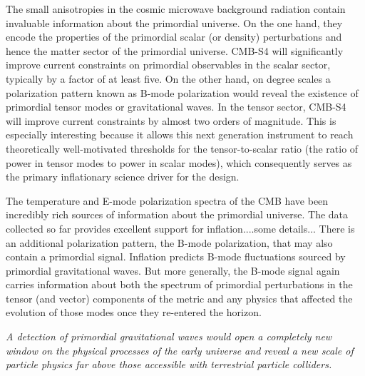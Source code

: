 The small anisotropies in the cosmic microwave background radiation contain invaluable information about the primordial universe. On the one hand, they encode the properties of the primordial scalar (or density) perturbations and hence the matter sector of the primordial universe. 
CMB-S4 will significantly improve current constraints on primordial observables in the scalar sector, typically by a factor of at least five. On the other hand, on degree scales a polarization pattern known as B-mode polarization would reveal the existence of primordial tensor modes or gravitational waves. In the tensor sector, CMB-S4 will improve current constraints by almost two orders of magnitude. This is especially interesting because it allows this next generation instrument to reach theoretically well-motivated thresholds for the tensor-to-scalar ratio (the ratio of power in tensor modes to power in scalar modes), which consequently serves as the primary inflationary science driver for the design. 

The temperature and E-mode polarization spectra of the CMB have been incredibly rich sources of information about the primordial universe. The data collected so far provides excellent support for inflation....some details... There is an additional polarization pattern, the B-mode polarization, that may also contain a primordial signal. Inflation predicts B-mode fluctuations  sourced by primordial gravitational waves. But more generally, the B-mode signal again carries information about both the spectrum of primordial perturbations in the tensor (and vector) components of the metric and any physics that affected the evolution of those modes once they re-entered the horizon.  

{\it A detection of primordial gravitational waves would open a completely new window on the physical processes of the early universe and reveal a new scale of particle physics far above those accessible with terrestrial particle colliders. }

